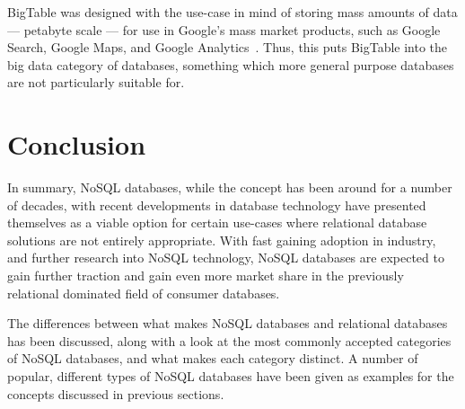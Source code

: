 \documentclass{article}
\begin{document}
BigTable was designed with the use-case in mind of storing mass amounts of data --- petabyte scale --- for use
in Google's mass market products, such as Google Search, Google Maps, and Google Analytics~\cite{chang2008bigtable}.
Thus, this puts BigTable into the big data category of databases, something which more general purpose databases are not
particularly suitable for.





\section{Conclusion} %
\label{sec:conclusion}

In summary, NoSQL databases, while the concept has been around for a number of decades, with recent developments
in database technology have presented themselves as a viable option for certain use-cases where relational
database solutions are not entirely appropriate. With fast gaining adoption in industry, and further research
into NoSQL technology, NoSQL databases are expected to gain further traction and gain even more market
share in the previously relational dominated field of consumer databases.

The differences between what makes NoSQL databases and relational databases has been discussed,
along with a look at the most commonly accepted categories of NoSQL databases, and what makes each category
distinct. A number of popular, different types of NoSQL databases have been given as examples for the concepts
discussed in previous sections.


\newpage



\end{document}
